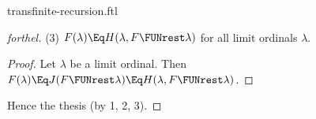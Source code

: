 \documentclass{stex}
\begin{document}
\begin{smodule}{transfinite-recursion.ftl}
\begin{proof}[forthel]
  (3) $F(\lambda) \Eq H(\lambda, F \FUNrest \lambda)$ for all limit ordinals $\lambda$.
  \begin{proof}
    Let $\lambda$ be a limit ordinal.
    Then $F(\lambda)
      \Eq J(F \FUNrest \lambda)
      \Eq H(\lambda, F \FUNrest \lambda)$.
  \end{proof}

  Hence the thesis (by 1, 2, 3).
\end{proof}

\printbibliography
{}
\end{smodule}
\end{document}
